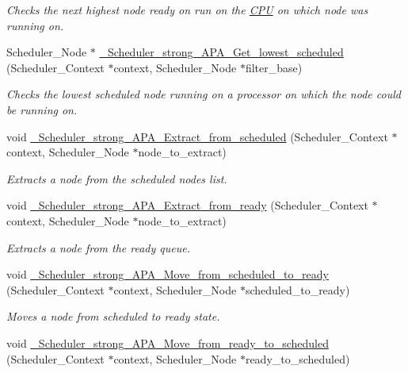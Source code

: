 \begin{DoxyCompactItemize}
\begin{DoxyCompactList}\small\item\em Checks the next highest node ready on run on the \hyperlink{structCPU}{C\+PU} on which  node was running on. \end{DoxyCompactList}\item 
Scheduler\+\_\+\+Node $\ast$ \hyperlink{group__RTEMSScoreSchedulerStrongAPA_ga26fb2df74c34c204d6f682ddae6b854d}{\+\_\+\+Scheduler\+\_\+strong\+\_\+\+A\+P\+A\+\_\+\+Get\+\_\+lowest\+\_\+scheduled} (Scheduler\+\_\+\+Context $\ast$context, Scheduler\+\_\+\+Node $\ast$filter\+\_\+base)
\begin{DoxyCompactList}\small\item\em Checks the lowest scheduled node running on a processor on which the  node could be running on. \end{DoxyCompactList}\item 
void \hyperlink{group__RTEMSScoreSchedulerStrongAPA_ga1a1e006053c3a9d1ad1d85c591b0aed7}{\+\_\+\+Scheduler\+\_\+strong\+\_\+\+A\+P\+A\+\_\+\+Extract\+\_\+from\+\_\+scheduled} (Scheduler\+\_\+\+Context $\ast$context, Scheduler\+\_\+\+Node $\ast$node\+\_\+to\+\_\+extract)
\begin{DoxyCompactList}\small\item\em Extracts a node from the scheduled node\textquotesingle{}s list. \end{DoxyCompactList}\item 
void \hyperlink{group__RTEMSScoreSchedulerStrongAPA_ga63c55c0e7bf77912bce6a91a6c1e09bf}{\+\_\+\+Scheduler\+\_\+strong\+\_\+\+A\+P\+A\+\_\+\+Extract\+\_\+from\+\_\+ready} (Scheduler\+\_\+\+Context $\ast$context, Scheduler\+\_\+\+Node $\ast$node\+\_\+to\+\_\+extract)
\begin{DoxyCompactList}\small\item\em Extracts a node from the ready queue. \end{DoxyCompactList}\item 
void \hyperlink{group__RTEMSScoreSchedulerStrongAPA_ga9589d6542faf83879288d437ca84c907}{\+\_\+\+Scheduler\+\_\+strong\+\_\+\+A\+P\+A\+\_\+\+Move\+\_\+from\+\_\+scheduled\+\_\+to\+\_\+ready} (Scheduler\+\_\+\+Context $\ast$context, Scheduler\+\_\+\+Node $\ast$scheduled\+\_\+to\+\_\+ready)
\begin{DoxyCompactList}\small\item\em Moves a node from scheduled to ready state. \end{DoxyCompactList}\item 
void \hyperlink{group__RTEMSScoreSchedulerStrongAPA_ga070d66ff37f268ddbbff1b7e6ac27ee3}{\+\_\+\+Scheduler\+\_\+strong\+\_\+\+A\+P\+A\+\_\+\+Move\+\_\+from\+\_\+ready\+\_\+to\+\_\+scheduled} (Scheduler\+\_\+\+Context $\ast$context, Scheduler\+\_\+\+Node $\ast$ready\+\_\+to\+\_\+scheduled)

\end{DoxyCompactItemize}
